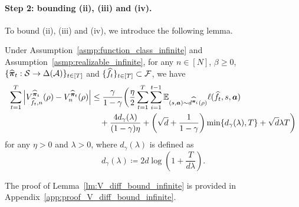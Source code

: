 \paragraph{Step 2: bounding (ii), (iii) and (iv).} To bound (ii), (iii) and (iv), we introduce the following lemma.
\begin{lm}\label{lm:V_diff_bound_infinite}
    Under Assumption~\ref{asmp:function_class_infinite} and Assumption~\ref{asmp:realizable_infinite}, for any $n\in[N]$, $\beta\geq 0$, $\{\widehat{{\bm{\pi}}}_t: {\mathcal{S}}\rightarrow\Delta({\mathcal{A}})\}_{t\in[T]}$ and $\{\widehat{f}_t\}_{t\in[T]}\subset {\mathcal{F}}$,  we have
    \begin{align}\label{eq:V_diff_bound_infinite}
       \sum_{t=1}^T \left|V_{\widehat{f}_t,n}^{\widehat{{\bm{\pi}}}_t}(\rho)-V_{n}^{\widehat{{\bm{\pi}}}_t}(\rho)\right|&\leq \frac{\gamma}{1-\gamma}\bigg(\frac{\eta}{2}\sum_{t=1}^T \sum_{i=1}^{t-1} \mathbb{E}_{(s,{\bm{a}})\sim d^{\widehat{{\bm{\pi}}}_i}(\rho)}\ell(\widehat{f}_t,s,{\bm{a}}) \notag\\
       &\quad+\frac{4d_\gamma(\lambda)}{(1-\gamma)\eta}
       + \left(\sqrt{d}+\frac{1}{1-\gamma}\right) \min\{d_\gamma(\lambda),T\} +\sqrt{d} \lambda T\bigg)
    \end{align}
    for any $\eta>0$ and $\lambda>0$, where $d_\gamma(\lambda)$ is defined as
    $$d_\gamma(\lambda)\coloneqq 2d\log\left(1+\frac{T}{d\lambda}\right).$$
\end{lm}
The proof of Lemma~\ref{lm:V_diff_bound_infinite} is provided in Appendix~\ref{app:proof_V_diff_bound_infinite}.

